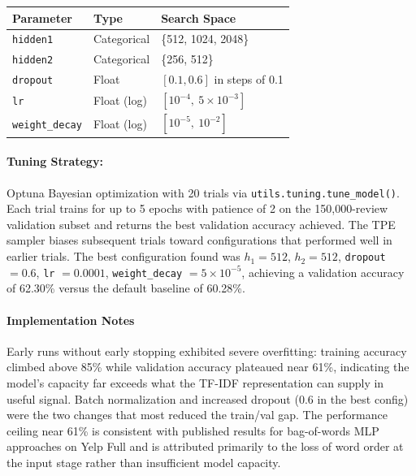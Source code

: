 \documentclass[12pt]{article}
\begin{document}
\begin{table}[H]
    \centering
    \begin{tabular}{lll}
        \toprule
        Parameter       & Type        & Search Space \\
        \midrule
        \texttt{hidden1}       & Categorical & \{512, 1024, 2048\} \\
        \texttt{hidden2}       & Categorical & \{256, 512\} \\
        \texttt{dropout}       & Float       & $[0.1, 0.6]$ in steps of 0.1 \\
        \texttt{lr}            & Float (log) & $[10^{-4},\ 5 \times 10^{-3}]$ \\
        \texttt{weight\_decay} & Float (log) & $[10^{-5},\ 10^{-2}]$ \\
        \bottomrule
    \end{tabular}
\end{table}

\paragraph{Tuning Strategy:}
Optuna Bayesian optimization with 20 trials via \texttt{utils.tuning.tune\_model()}. Each trial trains for up to 5 epochs with patience of 2 on the 150,000-review validation subset and returns the best validation accuracy achieved. The TPE sampler biases subsequent trials toward configurations that performed well in earlier trials. The best configuration found was $h_1 = 512$, $h_2 = 512$, \texttt{dropout} $= 0.6$, \texttt{lr} $= 0.0001$, \texttt{weight\_decay} $= 5 \times 10^{-5}$, achieving a validation accuracy of 62.30\% versus the default baseline of 60.28\%.

\paragraph{Implementation Notes}
Early runs without early stopping exhibited severe overfitting: training accuracy climbed above 85\% while validation accuracy plateaued near 61\%, indicating the model's capacity far exceeds what the TF-IDF representation can supply in useful signal. Batch normalization and increased dropout (0.6 in the best config) were the two changes that most reduced the train/val gap. The performance ceiling near 61\% is consistent with published results for bag-of-words MLP approaches on Yelp Full and is attributed primarily to the loss of word order at the input stage rather than insufficient model capacity.
\end{document}

